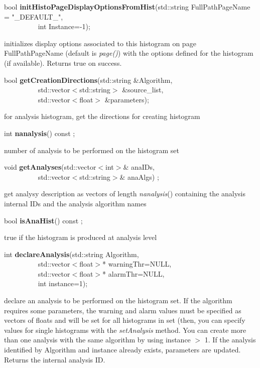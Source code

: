 \item    bool {\bf initHistoPageDisplayOptionsFromHist}(std::string FullPathPageName = "\_DEFAULT\_",\\\mbox{}~~~~~~~~~
					   int Instance=-1);

 initializes display options associated to this histogram on page
 FullPathPageName (default is {\it page()}) with the
 options defined for the histogram (if available). Returns true on
 success.


\item    bool {\bf getCreationDirections}(std::string \&Algorithm,\\\mbox{}~~~~~~~~~
			     std::vector$<$std::string$>$ \&source\_list,\\\mbox{}~~~~~~~~~
			     std::vector$<$float$>$ \&parameters);

 for analysis histogram, get the directions for creating histogram


\item    int {\bf nanalysis}() const ;

 number of analysis to be performed on the histogram set


\item    void {\bf getAnalyses}(std::vector$<$int$>$\& anaIDs,\\\mbox{}~~~~~~~~~
		   std::vector$<$std::string$>$\& anaAlgs) ;

 get analysy description as vectors of length {\it  nanalysis}() containing 
 the analysis internal IDs and the analysis algorithm names


\item    bool {\bf isAnaHist}() const ;

 true if the histogram is produced at analysis level


\item    int {\bf declareAnalysis}(std::string Algorithm,\\\mbox{}~~~~~~~~~ 
		      std::vector$<$float$>$* warningThr=NULL,\\\mbox{}~~~~~~~~~ 
		      std::vector$<$float$>$* alarmThr=NULL,\\\mbox{}~~~~~~~~~ 
		      int instance=1);

 declare an analysis to be performed on the histogram set. If the algorithm
 requires some parameters, the warning and alarm values must be
 specified as vectors of floats and will be set for all histograms in
 set (then, you can specify values for single histograms with the {\it
 setAnalysis} method. 
 You can create more than one analysis
 with the same algorithm by using instance $>$ 1. If the analysis
 identified by Algorithm and instance already exists, parameters are
 updated. Returns the internal analysis ID.


